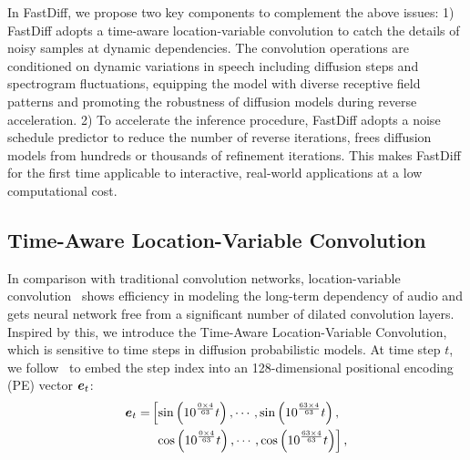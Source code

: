 In FastDiff, we propose two key components to complement the above issues: 1) FastDiff adopts a time-aware location-variable convolution to catch the details of noisy samples at dynamic dependencies. The convolution operations are conditioned on dynamic variations in speech including diffusion steps and spectrogram fluctuations, equipping the model with diverse receptive field patterns and promoting the robustness of diffusion models during reverse acceleration. 2) To accelerate the inference procedure, FastDiff adopts a noise schedule predictor to reduce the number of reverse iterations, frees diffusion models from hundreds or thousands of refinement iterations. This makes FastDiff for the first time applicable to interactive, real-world applications at a low computational cost.


\subsection{Time-Aware Location-Variable Convolution}


In comparison with traditional convolution networks, location-variable convolution~\cite{zeng2021lvcnet} shows efficiency in modeling the long-term dependency of audio and gets neural network free from a significant number of dilated convolution layers. Inspired by this, we introduce the Time-Aware Location-Variable Convolution, which is sensitive to time steps in diffusion probabilistic models. At time step $t$, we follow~\cite{vaswani2017attention} to embed the step index into an 128-dimensional positional encoding (PE) vector ${\bm{e}}_t$:
\begin{align*}
{\bm{e}}_t=&\left[\sin \left(10^{\frac{0 \times 4}{63}} t\right), \cdots, \sin \left(10^{\frac{63 \times 4}{63}} t\right),\right.\\
&\,\,\left.\cos \left(10^{\frac{0 \times 4}{63}} t\right), \cdots, \cos \left(10^{\frac{63 \times 4}{63}} t\right)\right],
\end{align*}

